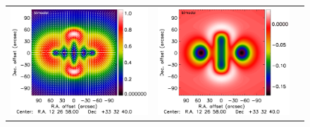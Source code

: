 \documentclass[twocolumn,traditabstract]{aa}
\begin{document}
\begin{figure}[h]
{\begin{tabular}{lll}
\includegraphics[trim=2.3cm 2.2cm 0cm 0cm, clip=true, scale=1]{Figure/Grad_bimodal_15_15_45.pdf} &
\includegraphics[trim=2.3cm 2.2cm 0cm 0cm, clip=true, scale=1]{Figure/DoG_bimodal_15_15_45.pdf} \\

\end{tabular}}
\end{figure}
\end{document}
